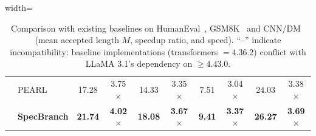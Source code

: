 \begin{table}[t]
\begin{adjustbox}{width=\textwidth}
\begin{tabular}{>{\centering\arraybackslash}p{1.2cm} p{1.2cm} cccccc c c}
                  & PEARL        & 17.28 & 3.75$\times$ & 14.33 & 3.35$\times$ & 7.51 & 3.04$\times$ & 24.03 & 3.38$\times$ \\
                  & \cellcolor{mygreen}\textbf{SpecBranch} & \cellcolor{mygreen}\textbf{21.74} & \cellcolor{mygreen}\textbf{4.02}$\times$ & \cellcolor{mygreen}\textbf{18.08} & \cellcolor{mygreen}\textbf{3.67}$\times$ & \cellcolor{mygreen}\textbf{9.41} & \cellcolor{mygreen}\textbf{3.37}$\times$ & \cellcolor{mygreen}\textbf{26.27} & \cellcolor{mygreen}\textbf{3.69}$\times$ \\
\bottomrule
\end{tabular}
\end{adjustbox}
\caption{{Comparison with existing baselines on HumanEval~\cite{chen2021codex}, GSM8K~\cite{Cobbe_Kosaraju_Bavarian_Hilton_Nakano_Hesse_Schulman_2021} and CNN/DM~\cite{Nallapati_Zhou_dos} (mean accepted length $M$, speedup ratio, and speed). ``--'' indicate incompatibility: baseline implementations (transformers $=4.36.2$) conflict with LLaMA 3.1’s dependency on $\geq 4.43.0$. }   }
\vspace*{-0.3in}
\label{tab:mainresult1}
\end{table}


